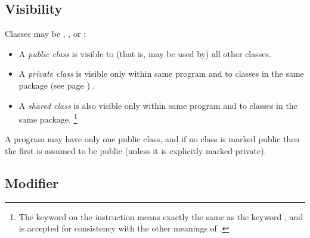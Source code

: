 \subsection{Visibility}
 
Classes may be , , or
:
\begin{itemize}
\item A \emph{public class} is visible to (that is, may be used by)
all other classes.
\item A \emph{private class} is visible only within same program and to
classes in the same  package (see page \pageref{refpackage}) .
\item A \emph{shared class} is also visible only within same program and to
classes in the same package.
\footnote{
The  keyword on the  instruction means
exactly the same as the keyword , and is accepted for
consistency with the other meanings of .
}
\end{itemize}
 
A program may have only one public class, and if no class is marked
public then the first is assumed to be public (unless it is explicitly
marked private).
\subsection{Modifier}
 

